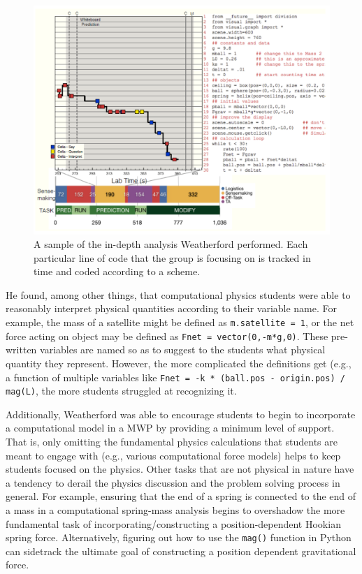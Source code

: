 \documentclass{msuphddissertation}
\begin{document}
\begin{doublespace}
\begin{figure}\center
\includegraphics[scale=0.60]{images/CH2Weatherford.pdf}
\caption{A sample of the in-depth analysis Weatherford performed.  Each particular line of code that the group is focusing on is tracked in time and coded according to a scheme.}\label{CH2:Weatherford}
\end{figure}

He found, among other things, that computational physics students were able to reasonably interpret physical quantities according to their variable name.  For example, the mass of a satellite might be defined as \texttt{m.satellite = 1}, or the net force acting on object may be defined as \texttt{Fnet = vector(0,-m*g,0)}.  These pre-written variables are named so as to suggest to the students what physical quantity they represent.  However, the more complicated the definitions get (e.g., a function of multiple variables like \texttt{Fnet = -k * (ball.pos - origin.pos) / mag(L)}, the more students struggled at recognizing it.

Additionally, Weatherford was able to encourage students to begin to incorporate a computational model in a MWP by providing a minimum level of support.  That is, only omitting the fundamental physics calculations that students are meant to engage with (e.g., various computational force models) helps to keep students focused on the physics.  Other tasks that are not physical in nature have a tendency to derail the physics discussion and the problem solving process in general.  For example, ensuring that the end of a spring is connected to the end of a mass in a computational spring-mass analysis begins to overshadow the more fundamental task of incorporating/constructing a position-dependent Hookian spring force.  Alternatively, figuring out how to use the \texttt{mag()} function in Python can sidetrack the ultimate goal of constructing a position dependent gravitational force.


\end{doublespace}
\end{document}
